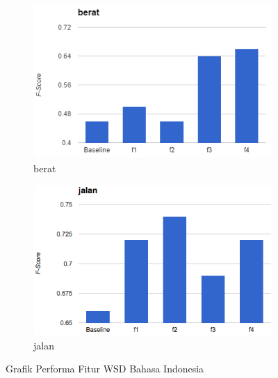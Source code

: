 \clearpage	
\begin{figure}[H]
	\ContinuedFloat
	\begin{subfigure}{.5\textwidth}
		\centering
		\includegraphics[width=1\linewidth]{adit_pics/berat.png}
		\caption{berat}
	\end{subfigure}%
	\begin{subfigure}{.5\textwidth}
		\centering
		\includegraphics[width=1\linewidth]{adit_pics/jalan.png}
		\caption{jalan}
	\end{subfigure}%
	\caption{Grafik Performa Fitur WSD Bahasa Indonesia}
	\label{fig:fitur-wsd-indo}
\end{figure} 

